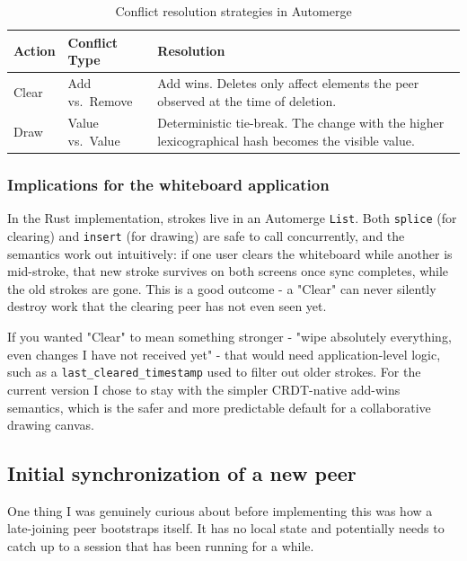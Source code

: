 \documentclass[a4paper,11pt,twoside]{report}
\theoremstyle{definition}
\begin{document}
\begin{table}[H]
    \centering
    \caption{Conflict resolution strategies in Automerge}
    \begin{tabular}{|p{}|p{}|p{}|}
        \hline
        \textbf{Action} & \textbf{Conflict Type} & \textbf{Resolution} \\
        \hline
        Clear & Add vs.\ Remove & Add wins. Deletes only affect elements the peer 
        observed at the time of deletion. \\
        \hline
        Draw & Value vs.\ Value & Deterministic tie-break. The change with the higher 
        lexicographical hash becomes the visible value. \\
        \hline
    \end{tabular}
    \label{tab:conflict-resolution}
\end{table}

\subsubsection*{Implications for the whiteboard application}

In the Rust implementation, strokes live in an Automerge \texttt{List}. Both \texttt{splice} 
(for clearing) and \texttt{insert} (for drawing) are safe to call concurrently,
 and the semantics work out intuitively: if one user clears the whiteboard while another is mid-stroke,
  that new stroke survives on both screens once sync completes, while the old strokes are gone. 
  This is a good outcome - a "Clear" can never silently destroy work that the clearing peer has not even seen yet.

If you wanted "Clear" to mean something stronger - "wipe absolutely everything, even changes I 
have not received yet" - that would need application-level logic,
 such as a \texttt{last\_cleared\_timestamp} used to filter out older strokes.
  For the current version I chose to stay with the simpler CRDT-native add-wins semantics, 
  which is the safer and more predictable default for a collaborative drawing canvas.


\subsection{Initial synchronization of a new peer}

One thing I was genuinely curious about before implementing this was how a late-joining peer
 bootstraps itself. It has no local state and potentially needs to catch up 
 to a session that has been running for a while.
\end{document}
